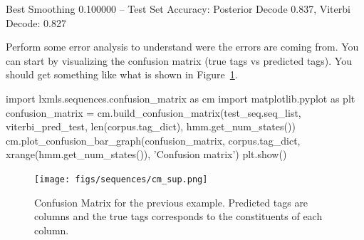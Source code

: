 \begin{exercise}
\begin{python}
Best Smoothing 0.100000 --  Test Set Accuracy: Posterior Decode 0.837, Viterbi Decode: 0.827
\end{python}


Perform some error analysis to understand were the errors are coming
from. You can start by visualizing the confusion matrix (true tags vs
predicted tags). You should get something like what is shown in Figure~\ref{fig:cmuns}.

\begin{python}
import lxmls.sequences.confusion_matrix as cm
import matplotlib.pyplot as plt
confusion_matrix = cm.build_confusion_matrix(test_seq.seq_list, viterbi_pred_test, len(corpus.tag_dict), hmm.get_num_states())
cm.plot_confusion_bar_graph(confusion_matrix, corpus.tag_dict, xrange(hmm.get_num_states()), 'Confusion matrix')
plt.show()
\end{python}

\begin{figure}[h!]
\centering
\texttt{[image: figs/sequences/cm\_sup.png]}
\caption{\label{fig:cmuns} Confusion Matrix for the previous
  example. Predicted tags are columns and the true tags corresponds to
  the constituents of each column.}
\end{figure}

\end{exercise}


%
%



